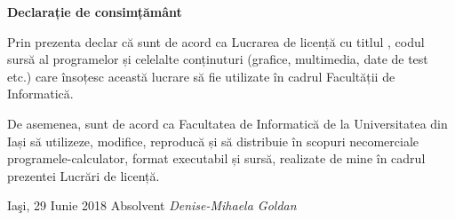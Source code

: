 \hfill \break
\hfill \break

\begin{center}
	\textbf{\large{Declarație de consimțământ}}
\end{center}

\hfill \break
\hfill \break

Prin prezenta declar că sunt de acord ca Lucrarea de licență cu titlul , codul sursă al programelor și celelalte conținuturi (grafice, multimedia, date de test etc.) care însoțesc această lucrare să fie utilizate în cadrul Facultății de Informatică. 

De asemenea, sunt de acord ca Facultatea de Informatică de la Universitatea  din Iași să utilizeze, modifice, reproducă și să distribuie în scopuri necomerciale programele-calculator, format executabil și sursă, realizate de mine în cadrul prezentei Lucrări de licență. 

\hfill \break
\hfill \break
\hfill \break
\hfill \break

Iaşi, 29 Iunie 2018 \hfill Absolvent\textit{ Denise-Mihaela Goldan}\\

\clearpage